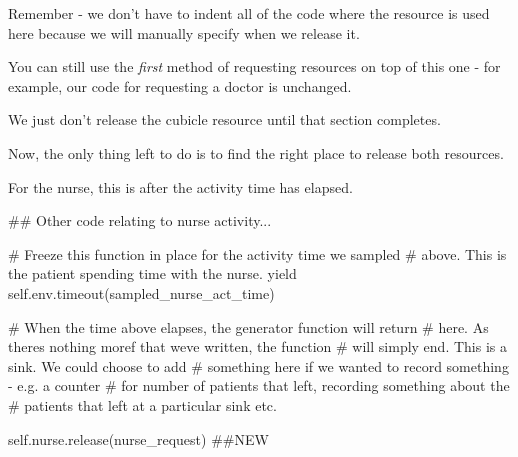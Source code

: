 \documentclass[
  letterpaper,
  DIV=11,
  numbers=noendperiod]{scrreprt}
\newenvironment{Shaded}{}{}
\newcommand{\CommentTok}[1]{\textcolor[rgb]{0.42,0.45,0.49}{#1}}
\newcommand{\ControlFlowTok}[1]{\textcolor[rgb]{0.84,0.23,0.29}{#1}}
\newcommand{\NormalTok}[1]{\textcolor[rgb]{0.14,0.16,0.18}{#1}}
\newcommand{\VariableTok}[1]{\textcolor[rgb]{0.89,0.38,0.04}{#1}}
\begin{document}
\begin{tcolorbox}[enhanced jigsaw, colframe=quarto-callout-tip-color-frame, bottomtitle=1mm, breakable, rightrule=.15mm, coltitle=black, colbacktitle=quarto-callout-tip-color!10!white, opacityback=0, leftrule=.75mm, arc=.35mm, toptitle=1mm, title=\textcolor{quarto-callout-tip-color}{\faLightbulb}\hspace{0.5em}{Tip}, titlerule=0mm, colback=white, toprule=.15mm, bottomrule=.15mm, left=2mm, opacitybacktitle=0.6]

Remember - we don't have to indent all of the code where the resource is
used here because we will manually specify when we release it.

You can still use the \emph{first} method of requesting resources on top
of this one - for example, our code for requesting a doctor is
unchanged.

We just don't release the cubicle resource until that section completes.

\end{tcolorbox}

Now, the only thing left to do is to find the right place to release
both resources.

For the nurse, this is after the activity time has elapsed.

\begin{Shaded}
\begin{Highlighting}[]
\CommentTok{\#\# Other code relating to nurse activity...}

\CommentTok{\# Freeze this function in place for the activity time we sampled}
\CommentTok{\# above.  This is the patient spending time with the nurse.}
\ControlFlowTok{yield} \VariableTok{self}\NormalTok{.env.timeout(sampled\_nurse\_act\_time)}

\CommentTok{\# When the time above elapses, the generator function will return}
\CommentTok{\# here.  As there\textquotesingle{}s nothing moref that we\textquotesingle{}ve written, the function}
\CommentTok{\# will simply end.  This is a sink.  We could choose to add}
\CommentTok{\# something here if we wanted to record something {-} e.g. a counter}
\CommentTok{\# for number of patients that left, recording something about the}
\CommentTok{\# patients that left at a particular sink etc.}

\VariableTok{self}\NormalTok{.nurse.release(nurse\_request) }\CommentTok{\#\#NEW}
\end{Highlighting}
\end{Shaded}
\end{document}
